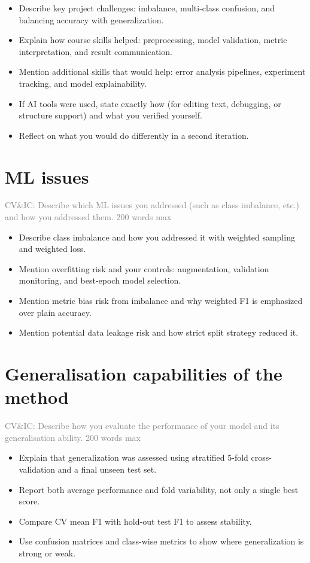 \documentclass{article}
\begin{document}
\begin{itemize}
    \item Describe key project challenges: imbalance, multi-class confusion, and balancing accuracy with generalization.
    \item Explain how course skills helped: preprocessing, model validation, metric interpretation, and result communication.
    \item Mention additional skills that would help: error analysis pipelines, experiment tracking, and model explainability.
    \item If AI tools were used, state exactly how (for editing text, debugging, or structure support) and what you verified yourself.
    \item Reflect on what you would do differently in a second iteration.
\end{itemize}

\section{ML issues}
\textcolor{gray}{CV\&IC: Describe which ML issues you addressed (such as class imbalance, etc.) and how you addressed them. 200 words max}

\begin{itemize}
    \item Describe class imbalance and how you addressed it with weighted sampling and weighted loss.
    \item Mention overfitting risk and your controls: augmentation, validation monitoring, and best-epoch model selection.
    \item Mention metric bias risk from imbalance and why weighted F1 is emphasized over plain accuracy.
    \item Mention potential data leakage risk and how strict split strategy reduced it.
\end{itemize}

\section{Generalisation capabilities of the method}
\textcolor{gray}{CV\&IC: Describe how you evaluate the performance of your model and its generalisation ability. 200 words max}

\begin{itemize}
    \item Explain that generalization was assessed using stratified 5-fold cross-validation and a final unseen test set.
    \item Report both average performance and fold variability, not only a single best score.
    \item Compare CV mean F1 with hold-out test F1 to assess stability.
    \item Use confusion matrices and class-wise metrics to show where generalization is strong or weak.
\end{itemize}
\end{document}
